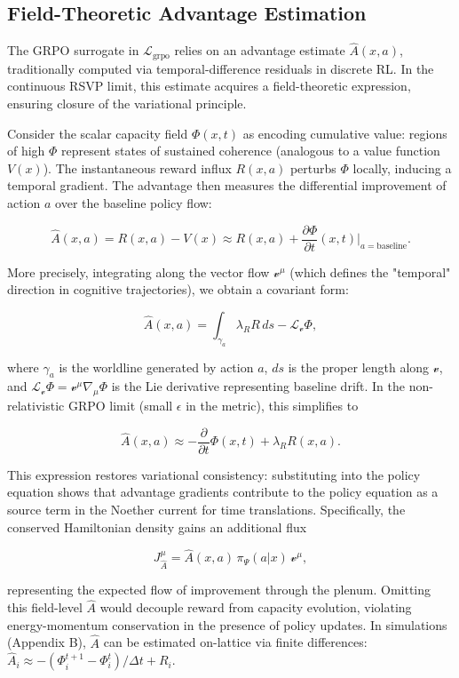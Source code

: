 \documentclass[11pt]{article}
\begin{document}
\subsection{Field-Theoretic Advantage Estimation}

The GRPO surrogate in $\mathcal{L}_{\mathrm{grpo}}$ relies on an advantage estimate $\hat{A}(x,a)$, traditionally computed via temporal-difference residuals in discrete RL. In the continuous RSVP limit, this estimate acquires a field-theoretic expression, ensuring closure of the variational principle.

Consider the scalar capacity field $\Phi(x,t)$ as encoding cumulative value: regions of high $\Phi$ represent states of sustained coherence (analogous to a value function $V(x)$). The instantaneous reward influx $R(x,a)$ perturbs $\Phi$ locally, inducing a temporal gradient. The advantage then measures the differential improvement of action $a$ over the baseline policy flow:

\[
\hat{A}(x,a) = R(x,a) - V(x) \approx R(x,a) + \frac{\partial \Phi}{\partial t}(x,t)\Big|_{a=\mathrm{baseline}}.
\]

More precisely, integrating along the vector flow $\mathcal{v}^\mu$ (which defines the "temporal" direction in cognitive trajectories), we obtain a covariant form:

\[
\hat{A}(x,a) = \int_{\gamma_a} \lambda_R R\, ds - \mathcal{L}_{\mathcal{v}}\Phi,
\]

where $\gamma_a$ is the worldline generated by action $a$, $ds$ is the proper length along $\mathcal{v}$, and $\mathcal{L}_{\mathcal{v}}\Phi = \mathcal{v}^\mu \nabla_\mu \Phi$ is the Lie derivative representing baseline drift. In the non-relativistic GRPO limit (small $\epsilon$ in the metric), this simplifies to

\[
\hat{A}(x,a) \approx -\frac{\partial}{\partial t} \Phi(x,t) + \lambda_R R(x,a).
\]

This expression restores variational consistency: substituting into the policy equation shows that advantage gradients contribute to the policy equation as a source term in the Noether current for time translations. Specifically, the conserved Hamiltonian density gains an additional flux

\[
J^\mu_{\hat{A}} = \hat{A}(x,a) \, \pi_\Psi(a|x) \, \mathcal{v}^\mu,
\]

representing the expected flow of improvement through the plenum. Omitting this field-level $\hat{A}$ would decouple reward from capacity evolution, violating energy-momentum conservation in the presence of policy updates. In simulations (Appendix B), $\hat{A}$ can be estimated on-lattice via finite differences: $\hat{A}_i \approx -(\Phi_i^{t+1} - \Phi_i^t)/\Delta t + R_i$.
\end{document}
